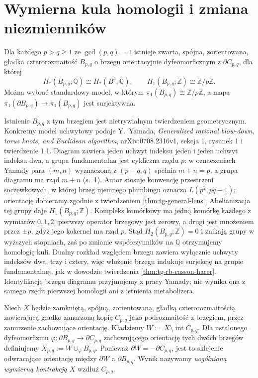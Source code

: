 \section{Wymierna kula homologii i zmiana niezmienników}
\label{sec:tg-general-operation}

\begin{twierdzenie}
\label{thm:tg-general-ball}
Dla każdego $p>q\geq1$ ze $\gcd(p,q)=1$ istnieje
zwarta, spójna, zorientowana, gładka czterorozmaitość
$B_{p,q}$ o brzegu orientacyjnie dyfeomorficznym z
$\partial C_{p,q}$, dla której
\[
H_*(B_{p,q};\mathbb Q)\cong H_*(B^4;\mathbb Q),
\qquad H_1(B_{p,q};\mathbb Z)\cong\mathbb Z/p\mathbb Z.
\]
Można wybrać standardowy model, w którym
$\pi_1(B_{p,q})\cong\mathbb Z/p\mathbb Z$, a mapa
$\pi_1(\partial B_{p,q})\to\pi_1(B_{p,q})$ jest surjektywna.
\end{twierdzenie}

\begin{uwaga}
Istnienie $B_{p,q}$ z tym brzegiem jest nietrywialnym
twierdzeniem geometrycznym. Konkretny model uchwytowy
podaje Y.~Yamada, \emph{Generalized rational blow-down,
torus knots, and Euclidean algorithm},
arXiv:0708.2316v1, sekcja 1, rysunek 1 i
twierdzenie 1.1. Diagram zawiera jeden uchwyt
indeksu jeden i jeden uchwyt indeksu dwa,
a grupa fundamentalna jest cykliczna rzędu $p$:
w oznaczeniach Yamady para $(m,n)$ wyznaczona
z $(p-q,q)$ spełnia $m+n=p$, a grupa diagramu
ma rząd $m+n$ (s.~1).
Autor stosuje konwencję przestrzeni soczewkowych,
w której brzeg ujemnego plumbingu oznacza
$L(p^2,pq-1)$; orientację dobieramy zgodnie
z twierdzeniem \ref{thm:tg-general-lens}.
Abelianizacja tej grupy daje $H_1(B_{p,q};\mathbb Z)$.
Kompleks komórkowy ma jedną komórkę każdego
z wymiarów $0,1,2$; pierwszy operator brzegowy
jest zerowy, a drugi jest mnożeniem przez $\pm p$,
gdyż jego kokernel ma rząd $p$. Stąd
$H_2(B_{p,q};\mathbb Z)=0$ i znikają grupy
w wyższych stopniach, zaś po zmianie współczynników
na $\mathbb Q$ otrzymujemy homologię kuli.
Dualny rozkład względem brzegu zawiera wyłącznie
uchwyty indeksów dwa, trzy i cztery, więc
włożenie brzegu indukuje surjekcję na grupie
fundamentalnej, jak w dowodzie twierdzenia
\ref{thm:tg-rb-casson-harer}. Identyfikację
brzegu diagramu przyjmujemy z pracy Yamady;
nie wynika ona z samego rzędu pierwszej homologii
ani z istnienia metabolizera.
\end{uwaga}

\begin{definicja}
Niech $X$ będzie zamkniętą, spójną, zorientowaną,
gładką czterorozmaitością zawierającą gładko zanurzoną
kopię $C_{p,q}$ jako podrozmaitość z brzegiem,
przez zanurzenie zachowujące orientację.
Kładziemy $W:=X\setminus\operatorname{int}C_{p,q}$.
Dla ustalonego dyfeomorfizmu
$\varphi:\partial B_{p,q}\to\partial C_{p,q}$ zachowującego
orientację tych dwóch brzegów definiujemy
$X_{p,q}:=W\cup_{\varphi}B_{p,q}$.
Ponieważ $\partial W=-\partial C_{p,q}$, jest to
sklejenie odwracające orientację między $\partial W$
a $\partial B_{p,q}$. Wynik nazywamy
\emph{uogólnioną wymierną kontrakcją} $X$ wzdłuż $C_{p,q}$.
\end{definicja}

